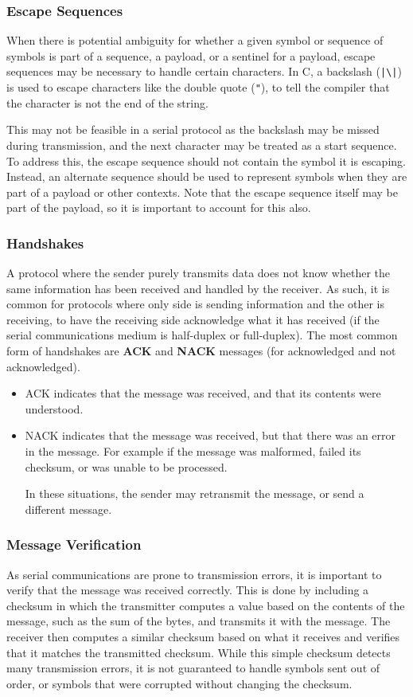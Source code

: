 \documentclass{article}
\begin{document}
\subsubsection{Escape Sequences}
When there is potential ambiguity for whether a given symbol or sequence
of symbols is part of a sequence, a payload, or a sentinel for a
payload, escape sequences may be necessary to handle certain characters.
In C, a backslash (\texttt{|\backslash|}) is
used to escape characters like the double quote (\texttt{"}), to
tell the compiler that the character is not the end of the string.

This may not be feasible in a serial protocol as the backslash may be
missed during transmission, and the next character may be treated as a
start sequence. To address this, the escape sequence should not contain
the symbol it is escaping. Instead, an alternate sequence should be used
to represent symbols when they are part of a payload or other contexts.
Note that the escape sequence itself may be part of the payload, so it
is important to account for this also.
\subsubsection{Handshakes}
A protocol where the sender purely transmits data does not know whether
the same information has been received and handled by the receiver. As
such, it is common for protocols where only side is sending information
and the other is receiving, to have the receiving side acknowledge what
it has received (if the serial communications medium is half-duplex or
full-duplex). The most common form of handshakes are \textbf{ACK} and
\textbf{NACK} messages (for acknowledged and not acknowledged).
\begin{itemize}
    \item ACK indicates that the message was received, and that its
          contents were understood.
    \item NACK indicates that the message was received, but that there
          was an error in the message. For example if the message was
          malformed, failed its checksum, or was unable to be processed.

          In these situations, the sender may retransmit the message, or
          send a different message.
\end{itemize}
\subsubsection{Message Verification}
As serial communications are prone to transmission errors, it is
important to verify that the message was received correctly. This is
done by including a checksum in which the transmitter computes a value
based on the contents of the message, such as the sum of the bytes, and
transmits it with the message. The receiver then computes a similar
checksum based on what it receives and verifies that it matches the
transmitted checksum. While this simple checksum detects many
transmission errors, it is not guaranteed to handle symbols sent out of
order, or symbols that were corrupted without changing the checksum.
\end{document}
